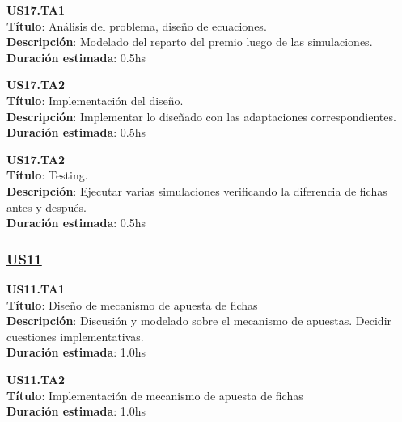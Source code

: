 \begin{tcolorbox}
\textbf{US17.TA1} \\
\textbf{Título}: Análisis del problema, diseño de ecuaciones. \\
\textbf{Descripción}: Modelado del reparto del premio luego de las simulaciones. 
\textbf{Duración estimada}: 0.5hs
\end{tcolorbox}
\vspace{10pt}

\begin{tcolorbox}
\textbf{US17.TA2} \\
\textbf{Título}: Implementación del diseño. \\
\textbf{Descripción}: Implementar lo diseñado con las adaptaciones correspondientes. \\
\textbf{Duración estimada}: 0.5hs
\end{tcolorbox}
\vspace{10pt}


\begin{tcolorbox}
\textbf{US17.TA2} \\
\textbf{Título}: Testing. \\
\textbf{Descripción}: Ejecutar varias simulaciones verificando la diferencia de fichas antes y después. \\
\textbf{Duración estimada}: 0.5hs 
\end{tcolorbox}
\vspace{10pt}


\subsubsection*{\underline{US11}}

\begin{tcolorbox}
\textbf{US11.TA1} \\
\textbf{Título}: Diseño de mecanismo de apuesta de fichas \\
\textbf{Descripción}: Discusión y modelado sobre el mecanismo de apuestas. Decidir cuestiones implementativas.\\
\textbf{Duración estimada}: 1.0hs
\end{tcolorbox}
\vspace{10pt}


\begin{tcolorbox}
\textbf{US11.TA2} \\
\textbf{Título}: Implementación de mecanismo de apuesta de fichas \\
\textbf{Duración estimada}: 1.0hs
\end{tcolorbox}
\vspace{10pt}


